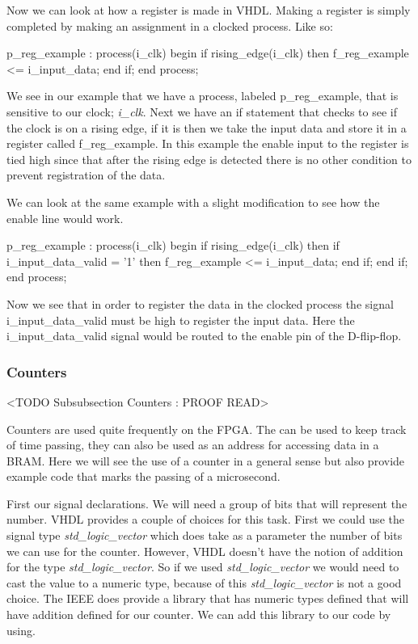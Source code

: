 Now we can look at how a register is made in \ac{VHDL}. Making a register is simply completed by making an assignment in a clocked process. Like so:

\begin{VHDLlisting}[tabsize=4]
p_reg_example : process(i_clk)
begin
	if rising_edge(i_clk) then
		f_reg_example <= i_input_data;
	end if;
end process;
\end{VHDLlisting}
	
We see in our example that we have a process, labeled p\_reg\_example, that is sensitive to our clock; \emph{i\_clk}. Next we have an if statement that checks to see if the clock is on a rising edge, if it is then we take the input data and store it in a register called f\_reg\_example. In this example the enable input to the register is tied high since that after the rising edge is detected there is no other condition to prevent registration of the data.  	
	
We can look at the same example with a slight modification to see how the enable line would work.
	

\begin{VHDLlisting}[tabsize=4]
p_reg_example : process(i_clk)
begin
	if rising_edge(i_clk) then
		if i_input_data_valid = '1' then
			f_reg_example <= i_input_data;
		end if;
	end if;
end process;
\end{VHDLlisting}
	
Now we see that in order to register the data in the clocked process the signal i\_input\_data\_valid must be high to register the input data. Here the i\_input\_data\_valid signal would be routed to the enable pin of the D-flip-flop.
	
	
\subsubsection{Counters}
	<TODO Subsubsection  Counters : PROOF READ>
	
Counters are used quite frequently on the \ac{FPGA}. The can be used to keep track of time passing, they can also be used as an address for accessing data in a \ac{BRAM}. Here we will see the use of a counter in a general sense but also provide example code that marks the passing of a microsecond. 

First our signal declarations. We will need a group of bits that will represent the number. \ac{VHDL} provides a couple of choices for this task. First we could use the signal type \emph{std\_logic\_vector} which does take as a parameter the number of bits we can use for the counter. However, \ac{VHDL} doesn't have the notion of addition for the type \emph{std\_logic\_vector}. So if we used \emph{std\_logic\_vector} we would need to cast the value to a numeric type, because of this \emph{std\_logic\_vector} is not a good choice. The \ac{IEEE} does provide a library that has numeric types defined that will have addition defined for our counter. We can add this library to our code by using. 


